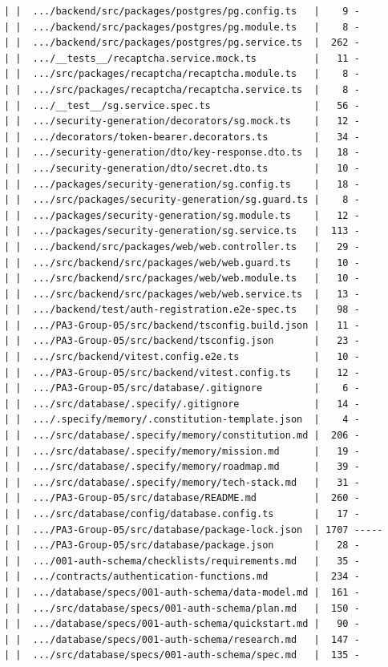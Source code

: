 \documentclass[12pt]{article}
\begin{document}
\begin{lstlisting}[numbers=none,breaklines=true]
| |  .../backend/src/packages/postgres/pg.config.ts   |    9 -
| |  .../backend/src/packages/postgres/pg.module.ts   |    8 -
| |  .../backend/src/packages/postgres/pg.service.ts  |  262 -
| |  .../__tests__/recaptcha.service.mock.ts          |   11 -
| |  .../src/packages/recaptcha/recaptcha.module.ts   |    8 -
| |  .../src/packages/recaptcha/recaptcha.service.ts  |    8 -
| |  .../__test__/sg.service.spec.ts                  |   56 -
| |  .../security-generation/decorators/sg.mock.ts    |   12 -
| |  .../decorators/token-bearer.decorators.ts        |   34 -
| |  .../security-generation/dto/key-response.dto.ts  |   18 -
| |  .../security-generation/dto/secret.dto.ts        |   10 -
| |  .../packages/security-generation/sg.config.ts    |   18 -
| |  .../src/packages/security-generation/sg.guard.ts |    8 -
| |  .../packages/security-generation/sg.module.ts    |   12 -
| |  .../packages/security-generation/sg.service.ts   |  113 -
| |  .../backend/src/packages/web/web.controller.ts   |   29 -
| |  .../src/backend/src/packages/web/web.guard.ts    |   10 -
| |  .../src/backend/src/packages/web/web.module.ts   |   10 -
| |  .../src/backend/src/packages/web/web.service.ts  |   13 -
| |  .../backend/test/auth-registration.e2e-spec.ts   |   98 -
| |  .../PA3-Group-05/src/backend/tsconfig.build.json |   11 -
| |  .../PA3-Group-05/src/backend/tsconfig.json       |   23 -
| |  .../src/backend/vitest.config.e2e.ts             |   10 -
| |  .../PA3-Group-05/src/backend/vitest.config.ts    |   12 -
| |  .../PA3-Group-05/src/database/.gitignore         |    6 -
| |  .../src/database/.specify/.gitignore             |   14 -
| |  .../.specify/memory/.constitution-template.json  |    4 -
| |  .../src/database/.specify/memory/constitution.md |  206 -
| |  .../src/database/.specify/memory/mission.md      |   19 -
| |  .../src/database/.specify/memory/roadmap.md      |   39 -
| |  .../src/database/.specify/memory/tech-stack.md   |   31 -
| |  .../PA3-Group-05/src/database/README.md          |  260 -
| |  .../src/database/config/database.config.ts       |   17 -
| |  .../PA3-Group-05/src/database/package-lock.json  | 1707 -----
| |  .../PA3-Group-05/src/database/package.json       |   28 -
| |  .../001-auth-schema/checklists/requirements.md   |   35 -
| |  .../contracts/authentication-functions.md        |  234 -
| |  .../database/specs/001-auth-schema/data-model.md |  161 -
| |  .../src/database/specs/001-auth-schema/plan.md   |  150 -
| |  .../database/specs/001-auth-schema/quickstart.md |   90 -
| |  .../database/specs/001-auth-schema/research.md   |  147 -
| |  .../src/database/specs/001-auth-schema/spec.md   |  135 -

\end{lstlisting}
\end{document}
